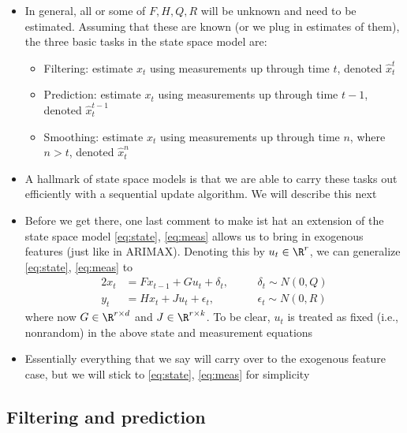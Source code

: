 \documentclass{article}
\begin{document}
\begin{itemize}
\item In general, all or some of $F,H,Q,R$ will be unknown and need to be
  estimated. Assuming that these are known (or we plug in estimates of them),
  the three basic tasks in the state space model are: 
  \begin{itemize}
  \item Filtering: estimate $x_t$ using measurements up through time $t$,
    denoted $\hat{x}_t^t$

\item Prediction: estimate $x_t$ using measurements up through time $t-1$,
  denoted $\hat{x}_t^{t-1}$ 

\item Smoothing: estimate $x_t$ using measurements up through time $n$, where $n 
  > t$, denoted $\hat{x}_t^n$ 
  \end{itemize}

\item A hallmark of state space models is that we are able to carry these tasks
  out efficiently with a sequential update algorithm. We will describe this next

\item Before we get there, one last comment to make ist hat an extension of the
  state space model \eqref{eq:state}, \eqref{eq:meas} allows us to bring in
  exogenous features (just like in ARIMAX). Denoting this by $u_t \in \R^r$, we
  can generalize \eqref{eq:state}, \eqref{eq:meas} to   
  \begin{alignat*}{2}
  x_t &= F x_{t-1} + G u_t + \delta_t, \quad &&\delta_t \sim N(0, Q) \\
  y_t &= H x_t + J u_t + \epsilon_t, \quad &&\epsilon_t \sim N(0, R) 
  \end{alignat*}
  where now $G \in \R^{r \times d}$ and $J \in \R^{r \times k}$. To be clear,
  $u_t$ is treated as fixed (i.e., nonrandom) in the above state and measurement 
  equations 

\item Essentially everything that we say will carry over to the exogenous
  feature case, but we will stick to \eqref{eq:state}, \eqref{eq:meas} for
  simplicity  
\end{itemize}

\subsection{Filtering and prediction}
\end{document}
